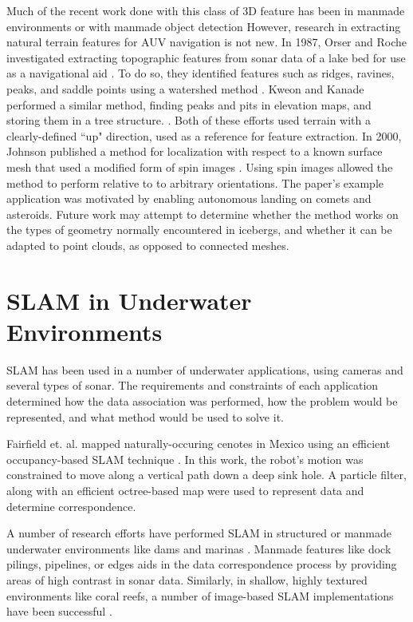 Much of the recent work done with this class of 3D feature has been in manmade environments or with manmade object detection \cite{Rusu2008,Rusu2011,Koppula2011} However, research in extracting natural terrain features for AUV navigation is not new. In 1987, Orser and Roche investigated extracting topographic features from sonar data of a lake bed for use as a navigational aid \cite{Orser1987}. To do so, they identified features such as ridges, ravines, peaks, and saddle points using a watershed method \cite{Sonka2014}. Kweon and Kanade performed a similar method, finding peaks and pits in elevation maps, and storing them in a tree structure. \cite{Kweon1994}. Both of these efforts used terrain with a clearly-defined ``up" direction, used as a reference for feature extraction. In 2000, Johnson published a method for localization with respect to a known surface mesh that used a modified form of spin images \cite{Johnson1999,Johnson2000}. Using spin images allowed the method to perform relative to to arbitrary orientations. The paper's example application was motivated by enabling autonomous landing on comets and asteroids. Future work may attempt to determine whether the method works on the types of geometry normally encountered in icebergs, and whether it can be adapted to point clouds, as opposed to connected meshes. 



\section{SLAM in Underwater Environments}


SLAM has been used in a number of underwater applications, using cameras and several types of sonar. The requirements and constraints of each application determined how the data association was performed, how the problem would be represented, and what method would be used to solve it.

Fairfield et. al. mapped naturally-occuring cenotes in Mexico using an efficient occupancy-based SLAM technique \cite{Fairfield2007}. In this work, the robot's motion was constrained to move along a vertical path down a deep sink hole. A particle filter, along with an efficient octree-based map were used to represent data and determine correspondence.

A number of research efforts have performed SLAM in structured or manmade underwater environments like dams and marinas \cite{Ribas2008}. Manmade features like dock pilings, pipelines, or edges aids in the data correspondence process by providing areas of high contrast in sonar data. Similarly, in shallow, highly textured environments like coral reefs, a number of image-based SLAM implementations have been successful \cite{Eustice2005}.

